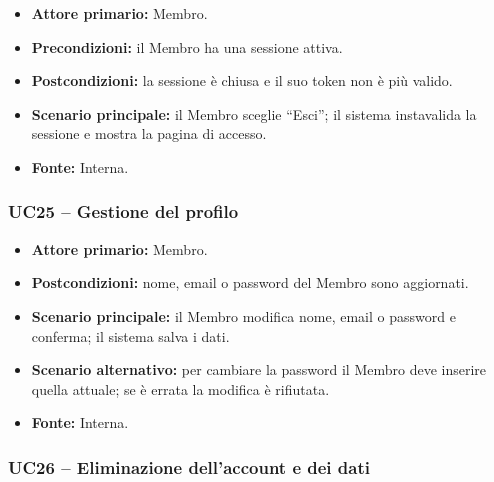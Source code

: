 \documentclass[12pt,a4paper]{article}
\newcommand{\tightlist}{\setlength{\itemsep}{1pt}\setlength{\parskip}{0pt}}
\begin{document}
\begin{itemize}

\tightlist

\item \textbf{Attore primario:} Membro.

\item \textbf{Precondizioni:} il Membro ha una sessione attiva.

\item \textbf{Postcondizioni:} la sessione è chiusa e il suo token non è più valido.

\item \textbf{Scenario principale:} il Membro sceglie ``Esci''; il sistema instavalida la sessione e mostra la pagina di accesso.

\item \textbf{Fonte:} Interna.

\end{itemize}



\subsubsection{UC25 -- Gestione del profilo}

\begin{itemize}

\tightlist

\item \textbf{Attore primario:} Membro.

\item \textbf{Postcondizioni:} nome, email o password del Membro sono aggiornati.

\item \textbf{Scenario principale:} il Membro modifica nome, email o password e conferma; il sistema salva i dati.

\item \textbf{Scenario alternativo:} per cambiare la password il Membro deve inserire quella attuale; se è errata la modifica è rifiutata.

\item \textbf{Fonte:} Interna.

\end{itemize}



\subsubsection{UC26 -- Eliminazione dell'account e dei dati}
\end{document}
